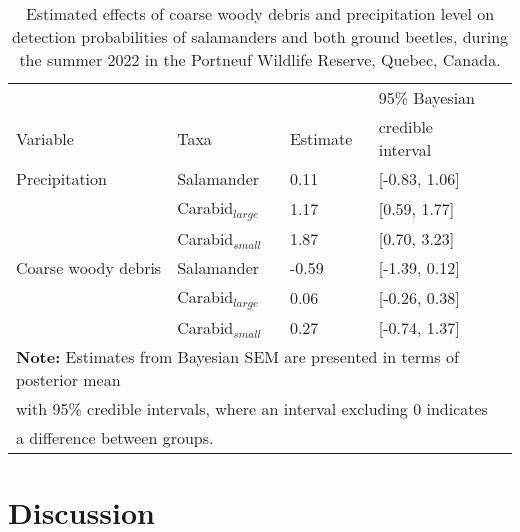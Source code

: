 \begin{table}[ht]
  \centering
  \caption[Estimated effects of coarse woody debris and precipitation level on detection probabilities of salamanders and both ground beetles.]
  {Estimated effects of coarse woody debris and precipitation level on detection probabilities of salamanders and both ground beetles, during the summer 2022 in the Portneuf Wildlife Reserve,  Quebec, Canada.}
  \label{tab:detection}
  \begin{tabular}{lllll} 
      \hline
      &&&95\% Bayesian \\
      Variable & Taxa & Estimate &  credible interval \\ [0.5ex] 
      \hline      
      Precipitation       & Salamander              & \hspace{1mm}0.11 & [-0.83, 1.06] \\ 
                          & Carabid$_{large}$  & \hspace{1mm}1.17 & [0.59, 1.77] \\ 
                          & Carabid$_{small}$        & \hspace{1mm}1.87 & [0.70, 3.23] \\  
      \hline      
      Coarse woody debris & Salamander              & -0.59 & [-1.39, 0.12] \\ 
                          & Carabid$_{large}$  & \hspace{1mm}0.06 & [-0.26, 0.38] \\ 
                          & Carabid$_{small}$        & \hspace{1mm}0.27 & [-0.74, 1.37] \\   

      \hline
      \multicolumn{4}{l}{\textbf{Note:} Estimates from Bayesian SEM are presented in terms of posterior mean} \\
      \multicolumn{4}{l}{with 95\% credible intervals, where an interval excluding 0 indicates} \\
      \multicolumn{4}{l}{a difference between groups.} \\
  \end{tabular}
\end{table}

\clearpage

\section*{Discussion}
\label{sec:discu1}


